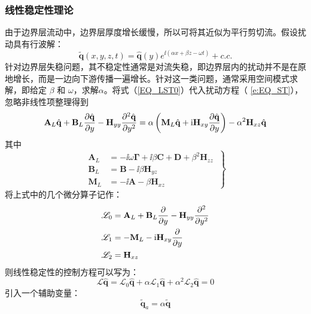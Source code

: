 \subsubsection{线性稳定性理论}
由于边界层流动中，边界层厚度增长缓慢，所以可将其近似为平行剪切流。假设扰动具有行波解：
\begin{equation}\label{EQ_LST0}
    \tilde{\mathbf{q}}(x,y,z,t)=
    \hat{\mathbf{q}}(y)e^{\ii (\alpha x+\beta z-\omega t)}+c.c.
\end{equation}
针对边界层失稳问题，其不稳定性通常是对流失稳，即边界层内的扰动并不是在原地增长，而是一边向下游传播一遍增长。针对这一类问题，通常采用空间模式求解，即给定 $\beta$ 和 $\omega$，求解$\alpha$。将式（\ref{EQ_LST0}）代入扰动方程（ \ref{e:EQ_ST}）， 忽略非线性项整理得到
\begin{equation}\label{EQ_LST1}
\mathbf{A}_L\hat{\mathbf{q}}+
\mathbf{B}_L\frac{\partial\hat{\mathbf{q}}}{\partial y}
-\mathbf{H}_{yy}\frac{\partial^2 \hat{\mathbf{q}}}{\partial y^2}=
\alpha\left(
\mathbf{M}_L\hat{\mathbf{q}}+
\textmd{i} \mathbf{H}_{xy}\frac{\partial\hat{\mathbf{q}}}{\partial y}\right)
-\alpha^2\mathbf{H}_{xz}\hat{\mathbf{q}}
\end{equation}
其中
\begin{equation}\left.
\begin{aligned}
\mathbf{A}_L&= -\ii\omega\mathbf{\Gamma}
         +\ii\beta\mathbf{C}
         +\mathbf{D}
         +\beta^2\mathbf{H}_{zz}\\
\mathbf{B}_L&= \mathbf{B}-\ii\beta\mathbf{H}_{yz}\\
\mathbf{M}_L&= -\ii\mathbf{A}-\beta\mathbf{H}_{xz}
\end{aligned}~\right\}
\end{equation}
将上式中的几个微分算子记作：
\begin{subequations}\label{e:LST_short}
\begin{align}
  \mathscr{L}_0 &=\mathbf{A}_L+
  \mathbf{B}_L\frac{\partial}{\partial y}
  -\mathbf{H}_{yy}\frac{\partial^2 }{\partial y^2} \\
  \mathscr{L}_1 &=-\mathbf{M}_L-\textmd{i} \mathbf{H}_{xy}\frac{\partial}{\partial y}\\
  \mathscr{L}_2 &=\mathbf{H}_{xz}
\end{align}
\end{subequations}
则线性稳定性的控制方程可以写为：
\begin{equation}\label{e:LST}
  \mathscr{L}\hat{\mathbf{q}}=\mathscr{L}_0\hat{\mathbf{q}}+\alpha \mathscr{L}_1\hat{\mathbf{q}} + \alpha^2\mathscr{L}_2\hat{\mathbf{q}}=0
\end{equation}
引入一个辅助变量：
\begin{equation}
  \tilde{\mathbf{q}}_a = \alpha\tilde{\mathbf{q}}
\end{equation}
